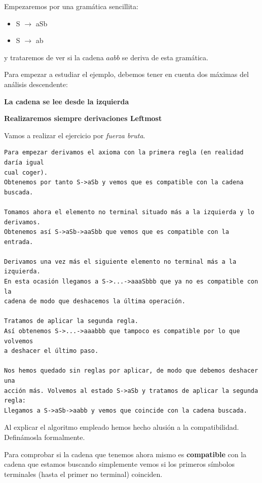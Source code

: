 \documentclass{apuntes}
\begin{document}
\begin{example}
Empezaremos por una gramática sencillita:
\begin{itemize}
\item S $\rightarrow$ aSb
\item S $\rightarrow$ ab
\end{itemize}
y trataremos de ver si la cadena $aabb$ se deriva de esta gramática.

Para empezar a estudiar el ejemplo, debemos tener en cuenta dos máximas del análisis descendente:

\textbf{La cadena se lee desde la izquierda}

\textbf{Realizaremos siempre derivaciones Leftmost}

\newpage
Vamos a realizar el ejercicio por \textit{fuerza bruta}.
\begin{verbatim}
Para empezar derivamos el axioma con la primera regla (en realidad daría igual
cual coger).
Obtenemos por tanto S->aSb y vemos que es compatible con la cadena buscada.

Tomamos ahora el elemento no terminal situado más a la izquierda y lo derivamos.
Obtenemos así S->aSb->aaSbb que vemos que es compatible con la entrada.

Derivamos una vez más el siguiente elemento no terminal más a la izquierda.
En esta ocasión llegamos a S->...->aaaSbbb que ya no es compatible con la
cadena de modo que deshacemos la última operación.

Tratamos de aplicar la segunda regla.
Así obtenemos S->...->aaabbb que tampoco es compatible por lo que volvemos
a deshacer el último paso.

Nos hemos quedado sin reglas por aplicar, de modo que debemos deshacer una
acción más. Volvemos al estado S->aSb y tratamos de aplicar la segunda regla:
Llegamos a S->aSb->aabb y vemos que coincide con la cadena buscada.
\end{verbatim}
\end{example}

Al explicar el algoritmo empleado hemos hecho alusión a la compatibilidad. Definámosla formalmente.

\begin{defn}[Compatibilidad]
Para comprobar si la cadena que tenemos ahora mismo es \textbf{compatible} con la cadena que estamos buscando simplemente vemos si los primeros símbolos terminales (hasta el primer no terminal) coinciden.
\end{defn}
\end{document}
